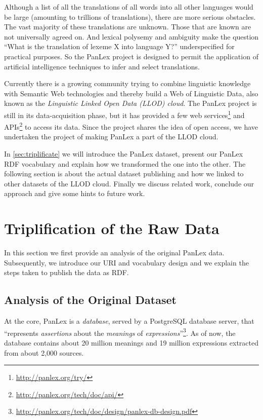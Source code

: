 \documentclass[sw]{iosart2c}
\begin{document}
Although a list of all the translations of all words into all other languages
would be large (amounting to trillions of translations), there are more
serious obstacles. The vast majority of these translations are unknown.
Those that are known are not universally agreed on. And lexical polysemy
and ambiguity make the question ``What is the translation of lexeme X into language Y?''
underspecified for practical purposes.
So the PanLex project is designed to permit the application of artificial
intelligence techniques to infer and select translations.

Currently there is a growing community trying to combine linguistic knowledge
with Semantic Web technologies and thereby build a Web of Linguistic Data,
also known as the \emph{Linguistic Linked Open Data (LLOD) cloud}.
The PanLex project is still in its data-acquisition phase, but it has provided a
few web services\footnote{\url{http://panlex.org/try/}} and
APIs\footnote{\url{http://panlex.org/tech/doc/api/}} to access its data.
Since the project shares the idea of open access, we have undertaken the project
of making PanLex a part of the LLOD cloud.

In \autoref{sec:triplificate} we will introduce the PanLex dataset, present our
PanLex RDF vocabulary and explain how we transformed the one into the other.
The following section is about the actual dataset publishing and how we linked
to other datasets of the LLOD cloud.
Finally we discuss related work, conclude our approach and give some hints to future work.

\section{Triplification of the Raw Data}
\label{sec:triplificate}
In this section we first provide an analysis of the original PanLex data.
Subsequently, we introduce our URI and vocabulary design and we explain 
the steps taken to publish the data as RDF.

\subsection{Analysis of the Original Dataset}
\label{sec:analysis}
At the core, PanLex is a \emph{database}, served by a PostgreSQL database server, that ``represents \emph{assertions} about the \emph{meanings} of \emph{expressions}''\footnote{\url{http://panlex.org/tech/doc/design/panlex-db-design.pdf}}.
As of now, the database contains about 20 million meanings and 19 million expressions extracted from about 2,000 sources.
\end{document}
